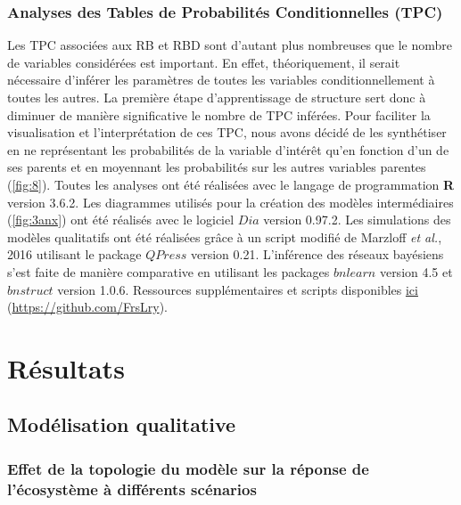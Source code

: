 \documentclass[12pt]{report}
\begin{document}
        \subsection{Analyses des Tables de Probabilités Conditionnelles (TPC)}

Les TPC associées aux RB et RBD sont d’autant plus nombreuses que le nombre de variables considérées est important. En effet, théoriquement, il serait nécessaire d’inférer les paramètres de toutes les variables conditionnellement à toutes les autres. La première étape d’apprentissage de structure sert donc à diminuer de manière significative le nombre de TPC inférées. Pour faciliter la visualisation et l’interprétation de ces TPC, nous avons décidé de les synthétiser en ne représentant les probabilités de la variable d’intérêt qu’en fonction d’un de ses parents et en moyennant les probabilités sur les autres variables parentes (\autoref{fig:8}). 
\newline \newline
Toutes les analyses ont été réalisées avec le langage de programmation \textbf{\textsf{R}} version 3.6.2. Les diagrammes utilisés pour la création des modèles intermédiaires (\autoref{fig:3anx}) ont été réalisés avec le logiciel $Dia$ version 0.97.2. Les simulations des modèles qualitatifs ont été réalisées grâce à un script modifié de Marzloff \textit{et al.}, 2016 utilisant le package $QPress$ version 0.21. L'inférence des réseaux bayésiens s'est faite de manière comparative en utilisant les packages $bnlearn$ version 4.5 et $bnstruct$ version 1.0.6. \newline
Ressources supplémentaires et scripts disponibles \href{https://github.com/FrsLry/Projet_Ifremer}{ici}
(\href{https://github.com/FrsLry/Projet_Ifremer}{https://github.com/FrsLry}).

\vspace{50pt}


\chapter{Résultats}
    \section{Modélisation qualitative}
    \subsection{ Effet de la topologie du modèle sur la réponse de l'écosystème à différents scénarios}
    \label{mod.quali}
\end{document}
